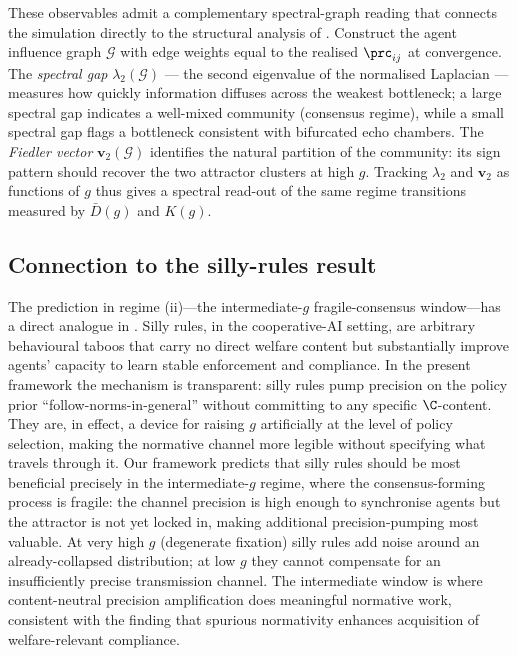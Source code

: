 These observables admit a complementary spectral-graph reading that
connects the simulation directly to the structural analysis of
\citet{heins2024CollectiveSurprise}. Construct the agent influence graph
$\mathcal{G}$ with edge weights equal to the realised $\prc_{ij}$ at
convergence. The \emph{spectral gap} $\lambda_2(\mathcal{G})$ --- the second
eigenvalue of the normalised Laplacian --- measures how quickly information
diffuses across the weakest bottleneck; a large spectral gap indicates a
well-mixed community (consensus regime), while a small spectral gap flags a
bottleneck consistent with bifurcated echo chambers. The \emph{Fiedler
vector} $\mathbf{v}_2(\mathcal{G})$ identifies the natural partition of the
community: its sign pattern should recover the two attractor clusters at high
$g$. Tracking $\lambda_2$ and $\mathbf{v}_2$ as functions of $g$ thus gives
a spectral read-out of the same regime transitions measured by
$\bar{D}(g)$ and $K(g)$.

\subsection*{Connection to the silly-rules result}

The prediction in regime (ii)---the intermediate-$g$ fragile-consensus
window---has a direct analogue in \citet{koster2022SillyRules}. Silly rules,
in the cooperative-AI setting, are arbitrary behavioural taboos that carry no
direct welfare content but substantially improve agents' capacity to learn
stable enforcement and compliance. In the present framework the mechanism is
transparent: silly rules pump precision on the policy prior
``follow-norms-in-general'' without committing to any specific $\C$-content.
They are, in effect, a device for raising $g$ artificially at the level of
policy selection, making the normative channel more legible without specifying
what travels through it. Our framework predicts that silly rules should be
most beneficial precisely in the intermediate-$g$ regime, where the
consensus-forming process is fragile: the channel precision is high enough to
synchronise agents but the attractor is not yet locked in, making additional
precision-pumping most valuable. At very high $g$ (degenerate fixation) silly
rules add noise around an already-collapsed distribution; at low $g$ they
cannot compensate for an insufficiently precise transmission channel. The
intermediate window is where content-neutral precision amplification does
meaningful normative work, consistent with the \citeauthor{koster2022SillyRules}
finding that spurious normativity enhances acquisition of welfare-relevant
compliance.


